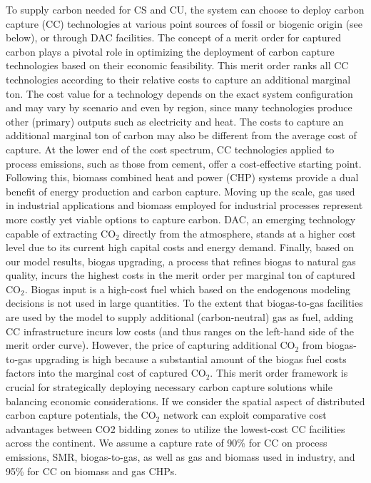 \documentclass[twocolumn]{article}
\newcommand{\COtwo}{CO$_2$}
\begin{document}
To supply carbon needed for CS and CU, the system can choose to deploy carbon capture (CC) technologies at various point sources of fossil or biogenic origin (see below), or through DAC facilities.
The concept of a merit order for captured carbon plays a pivotal role in optimizing the deployment of carbon capture technologies based on their economic feasibility.
This merit order ranks all CC technologies according to their relative costs to capture an additional marginal ton. The cost value for a technology depends on the exact system configuration and may vary by scenario and even by region, since many technologies produce other (primary) outputs such as electricity and heat. The costs to capture an additional marginal ton of carbon may also be different from the average cost of capture.
At the lower end of the cost spectrum, CC technologies applied to process emissions, such as those from cement, offer a cost-effective starting point.
Following this, biomass combined heat and power (CHP) systems provide a dual benefit of energy production and carbon capture.
Moving up the scale, gas used in industrial applications and biomass employed for industrial processes represent more costly yet viable options to capture carbon.
DAC, an emerging technology capable of extracting \COtwo{} directly from the atmosphere, stands at a higher cost level due to its current high capital costs and energy demand.
Finally, based on our model results, biogas upgrading, a process that refines biogas to natural gas quality, incurs the highest costs in the merit order per marginal ton of captured \COtwo{}.
Biogas input is a high-cost fuel which based on the endogenous modeling decisions is not used in large quantities.
To the extent that biogas-to-gas facilities are used by the model to supply additional (carbon-neutral) gas as fuel, adding CC infrastructure incurs low costs (and thus ranges on the left-hand side of the merit order curve).
However, the price of capturing additional \COtwo{} from biogas-to-gas upgrading is high because a substantial amount of the biogas fuel costs factors into the marginal cost of captured \COtwo{}.
This merit order framework is crucial for strategically deploying necessary carbon capture solutions while balancing economic considerations.
If we consider the spatial aspect of distributed carbon capture potentials, the \COtwo{} network can exploit comparative cost advantages between CO2 bidding zones to utilize the lowest-cost CC facilities across the continent.
We assume a capture rate of 90\% for CC on process emissions, SMR, biogas-to-gas, as well as gas and biomass used in industry, and 95\% for CC on biomass and gas CHPs.
\end{document}
